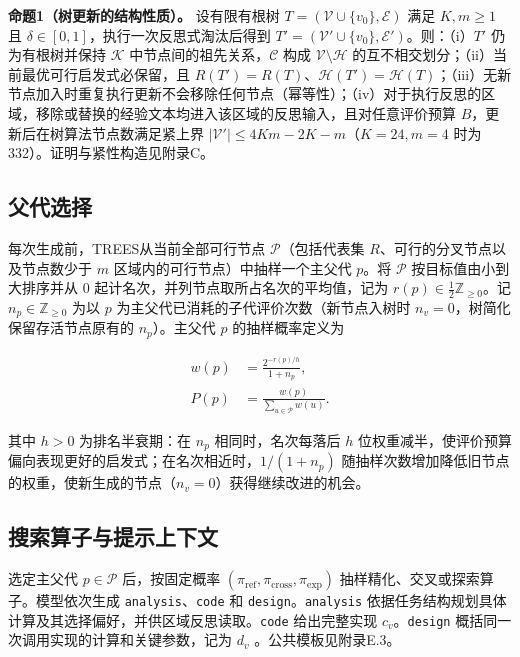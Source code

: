 \documentclass{article}
\begin{document}
\textbf{命题1（树更新的结构性质）。} 设有限有根树 \(T=(\mathcal V\cup\{v_0\},\mathcal E)\) 满足 \(K,m\geq 1\) 且 \(\delta\in[0,1]\)，执行一次反思式淘汰后得到 \(T'=(\mathcal V'\cup\{v_0\},\mathcal E')\)。则：（i）\(T'\) 仍为有根树并保持 \(\mathcal K\) 中节点间的祖先关系，\(\mathcal C\) 构成 \(\mathcal V\setminus\mathcal H\) 的互不相交划分；（ii）当前最优可行启发式必保留，且 \(R(T')=R(T)\)、\(\mathcal H(T')=\mathcal H(T)\)；（iii）无新节点加入时重复执行更新不会移除任何节点（幂等性）；（iv）对于执行反思的区域，移除或替换的经验文本均进入该区域的反思输入，且对任意评价预算 \(B\)，更新后在树算法节点数满足紧上界 \(|\mathcal V'|\leq 4Km-2K-m\)（\(K=24,m=4\) 时为332）。证明与紧性构造见附录C。

\subsection{父代选择}\label{ux7236ux4ee3ux9009ux62e9}

每次生成前，TREES从当前全部可行节点 \(\mathcal P\)（包括代表集 \(R\)、可行的分叉节点以及节点数少于 \(m\) 区域内的可行节点）中抽样一个主父代 \(p\)。将 \(\mathcal P\) 按目标值由小到大排序并从 \(0\) 起计名次，并列节点取所占名次的平均值，记为 \(r(p)\in\tfrac{1}{2}\mathbb Z_{\geq 0}\)。记 \(n_p\in\mathbb Z_{\geq 0}\) 为以 \(p\) 为主父代已消耗的子代评价次数（新节点入树时 \(n_v=0\)，树简化保留存活节点原有的 \(n_p\)）。主父代 \(p\) 的抽样概率定义为

\[
\begin{aligned}
w(p) &= \frac{2^{-r(p)/h}}{1+n_p},\\
P(p) &= \frac{w(p)}{\sum_{u\in\mathcal P}w(u)}.
\end{aligned}
\tag{4}
\]

其中 \(h>0\) 为排名半衰期：在 \(n_p\) 相同时，名次每落后 \(h\) 位权重减半，使评价预算偏向表现更好的启发式；在名次相近时，\(1/(1+n_p)\) 随抽样次数增加降低旧节点的权重，使新生成的节点（\(n_v=0\)）获得继续改进的机会。

\subsection{搜索算子与提示上下文}\label{ux641cux7d22ux7b97ux5b50ux4e0eux63d0ux793aux4e0aux4e0bux6587}

选定主父代 \(p\in\mathcal P\) 后，按固定概率 \((\pi_{\text{ref}},\pi_{\text{cross}},\pi_{\text{exp}})\) 抽样精化、交叉或探索算子。模型依次生成 \texttt{analysis}、\texttt{code} 和 \texttt{design}。\texttt{analysis} 依据任务结构规划具体计算及其选择偏好，并供区域反思读取。\texttt{code} 给出完整实现 \(c_v\)。\texttt{design} 概括同一次调用实现的计算和关键参数，记为 \(d_v\) \citep{eoh, mctsahd}。公共模板见附录E.3。
\end{document}
